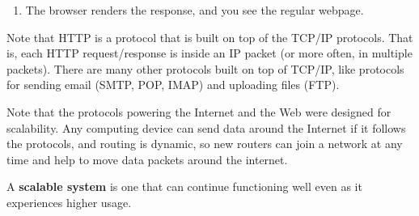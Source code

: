 \documentclass{article}
\newcounter{definition}[section]
\newcounter{example}[section]
\newcounter{code}[section]
\begin{document}
\begin{enumerate}
\begin{lstlisting}
              <p>This domain is to be used for illustrative examples in documents.</p>
          </body>
      </html>
      \end{lstlisting}
      \begin{enumerate}
          \item The $\texttt{HTTP/1.1}$ is the protocol and version. The next number is the \textbf{HTTP status code}. In this case, a $\texttt{200}$ represents a successful retrieval of the document, "OK." Another code is the $\texttt{404}$ code, which represents "file not found."
          \item The 2nd and 3rd lines are the \textbf{headers}, which provides additional details. The content-type tells the browser what type of document is being sent back. $\texttt{text/html}$ represent HTML text files; $\texttt{image/png}$ represent images; $\texttt{video/mpeg}$ are videos; $\texttt{application/javascript}$ are scripts; and so on. The content length gives the length of the document in bytes. 
          \item The rest of the HTTP response writes our the actual document requested. 
      \end{enumerate}
      \item The browser renders the response, and you see the regular webpage. 
  \end{enumerate}

  Note that HTTP is a protocol that is built on top of the TCP/IP protocols. That is, each HTTP request/response is inside an IP packet (or more often, in multiple packets). There are many other protocols built on top of TCP/IP, like protocols for sending email (SMTP, POP, IMAP) and uploading files (FTP). 

  Note that the protocols powering the Internet and the Web were designed for scalability. Any computing device can send data around the Internet if it follows the protocols, and routing is dynamic, so new routers can join a network at any time and help to move data packets around the internet.

  \begin{definition}
    \label{def:scalable-system}
  A \textbf{scalable system} is one that can continue functioning well even as it experiences higher usage. 
  \end{definition}
\end{document}
